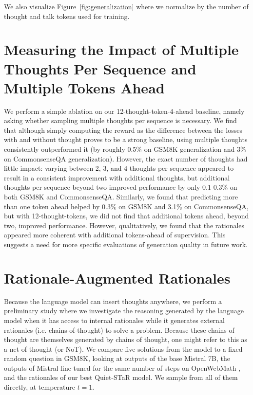 \documentclass{article} %
\begin{document}
\label{app:computeadj}
We also visualize Figure~\ref{fig:generalization} where we normalize by the number of thought and talk tokens used for training. 

\section{Measuring the Impact of Multiple Thoughts Per Sequence and Multiple Tokens Ahead}
\label{app:ablations}
We perform a simple ablation on our 12-thought-token-4-ahead baseline, namely asking whether sampling multiple thoughts per sequence is necessary. We find that although simply computing the reward as the difference between the losses with and without thought proves to be a strong baseline, using multiple thoughts consistently outperformed it (by roughly 0.5\% on GSM8K generalization and 3\% on CommonsenseQA generalization). However, the exact number of thoughts had little impact: varying between 2, 3, and 4 thoughts per sequence appeared to result in a consistent improvement with additional thoughts, but additional thoughts per sequence beyond two improved performance by only 0.1-0.3\% on both GSM8K and CommonsenseQA. Similarly, we found that predicting more than one token ahead helped by 0.3\% on GSM8K and 3.1\% on CommonsenseQA, but with 12-thought-tokens, we did not find that additional tokens ahead, beyond two, improved performance. However, qualitatively, we found that the rationales appeared more coherent with additional tokens-ahead of supervision. This suggests a need for more specific evaluations of generation quality in future work.


\section{Rationale-Augmented Rationales}
\label{app:cotofcot}
Because the language model can insert thoughts anywhere, we perform a preliminary study where we investigate the reasoning generated by the language model when it has access to internal rationales while it generates external rationales (i.e. chains-of-thought) to solve a problem. Because these chains of thought are themselves generated by chains of thought, one might refer to this as a net-of-thought (or NoT). We compare five solutions from the model to a fixed random question in GSM8K, looking at outputs of the base Mistral 7B, the outputs of Mistral fine-tuned for the same number of steps on OpenWebMath \citep{paster2023openwebmath}, and the rationales of our best Quiet-STaR model. We sample from all of them directly, at temperature $t=1$.
\end{document}
